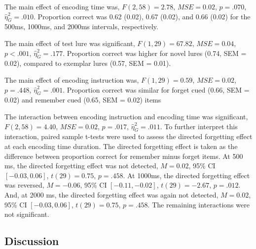 \documentclass[
  english,
  man,floatsintext]{apa6}
\begin{document}
The main effect of encoding time was, \(F(2, 58) = 2.78\), \(\mathit{MSE} = 0.02\), \(p = .070\), \(\hat{\eta}^2_G = .010\). Proportion correct was 0.62 (0.02), 0.67 (0.02), and 0.66 (0.02) for the 500ms, 1000ms, and 2000ms intervals, respectively.

The main effect of test lure was significant, \(F(1, 29) = 67.82\), \(\mathit{MSE} = 0.04\), \(p < .001\), \(\hat{\eta}^2_G = .177\). Proportion correct was higher for novel lures (0.74, SEM = 0.02), compared to exemplar lures (0.57, SEM = 0.01).

The main effect of encoding instruction was, \(F(1, 29) = 0.59\), \(\mathit{MSE} = 0.02\), \(p = .448\), \(\hat{\eta}^2_G = .001\). Proportion correct was similar for forget cued (0.66, SEM = 0.02) and remember cued (0.65, SEM = 0.02) items

The interaction between encoding instruction and encoding time was significant, \(F(2, 58) = 4.40\), \(\mathit{MSE} = 0.02\), \(p = .017\), \(\hat{\eta}^2_G = .011\). To further interpret this interaction, paired sample t-tests were used to assess the directed forgetting effect at each encoding time duration. The directed forgetting effect is taken as the difference between proportion correct for remember minus forget items. At 500 ms, the directed forgetting effect was not detected, \(M = 0.02\), 95\% CI \([-0.03, 0.06]\), \(t(29) = 0.75\), \(p = .458\). At 1000ms, the directed forgetting effect was reversed, \(M = -0.06\), 95\% CI \([-0.11, -0.02]\), \(t(29) = -2.67\), \(p = .012\). And, at 2000 ms, the directed forgetting effect was again not detected, \(M = 0.02\), 95\% CI \([-0.03, 0.06]\), \(t(29) = 0.75\), \(p = .458\). The remaining interactions were not significant.

\hypertarget{discussion}{%
\subsection{Discussion}\label{discussion}}
\end{document}

